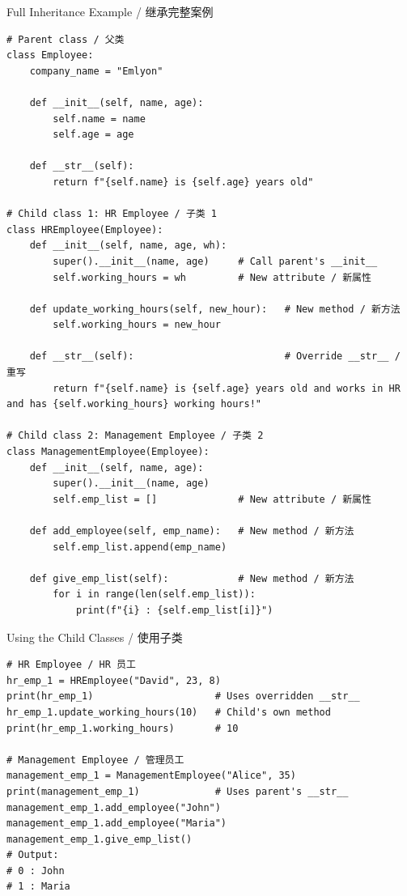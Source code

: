 \documentclass[11pt,a4paper]{report}
\begin{document}
\begin{examplebox}{Full Inheritance Example / 继承完整案例}
\begin{lstlisting}
# Parent class / 父类
class Employee:
    company_name = "Emlyon"

    def __init__(self, name, age):
        self.name = name
        self.age = age

    def __str__(self):
        return f"{self.name} is {self.age} years old"

# Child class 1: HR Employee / 子类 1
class HREmployee(Employee):
    def __init__(self, name, age, wh):
        super().__init__(name, age)     # Call parent's __init__
        self.working_hours = wh         # New attribute / 新属性

    def update_working_hours(self, new_hour):   # New method / 新方法
        self.working_hours = new_hour

    def __str__(self):                          # Override __str__ / 重写
        return f"{self.name} is {self.age} years old and works in HR and has {self.working_hours} working hours!"

# Child class 2: Management Employee / 子类 2
class ManagementEmployee(Employee):
    def __init__(self, name, age):
        super().__init__(name, age)
        self.emp_list = []              # New attribute / 新属性

    def add_employee(self, emp_name):   # New method / 新方法
        self.emp_list.append(emp_name)

    def give_emp_list(self):            # New method / 新方法
        for i in range(len(self.emp_list)):
            print(f"{i} : {self.emp_list[i]}")
\end{lstlisting}
\end{examplebox}

\begin{examplebox}{Using the Child Classes / 使用子类}
\begin{lstlisting}
# HR Employee / HR 员工
hr_emp_1 = HREmployee("David", 23, 8)
print(hr_emp_1)                     # Uses overridden __str__
hr_emp_1.update_working_hours(10)   # Child's own method
print(hr_emp_1.working_hours)       # 10

# Management Employee / 管理员工
management_emp_1 = ManagementEmployee("Alice", 35)
print(management_emp_1)             # Uses parent's __str__
management_emp_1.add_employee("John")
management_emp_1.add_employee("Maria")
management_emp_1.give_emp_list()
# Output:
# 0 : John
# 1 : Maria
\end{lstlisting}
\end{examplebox}
\end{document}
